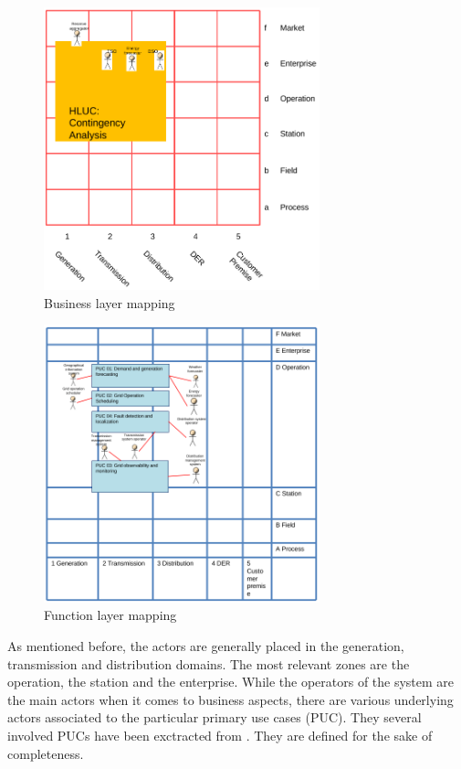 \begin{figure}[!htb]\centering
  \includegraphics[width=8.0cm]{Data/business.png}
\caption{Business layer mapping}
\label{fig:busins}
\end{figure}


\begin{figure}[!htb]\centering
  \includegraphics[width=8.0cm]{Data/function.png}
\caption{Function layer mapping}
\label{fig:functs}
\end{figure}

As mentioned before, the actors are generally placed in the generation, transmission and distribution domains. The most relevant zones are the operation, the station and the enterprise. While the operators of the system are the main actors when it comes to business aspects, there are various underlying actors associated to the particular primary use cases (PUC). They several involved PUCs have been exctracted from \cite{melendez2019resolvd}. They are defined for the sake of completeness. 


